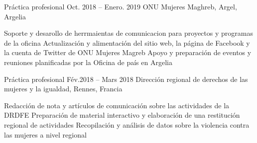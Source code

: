 \begin{joblist}

\item[Práctica profesional]{Oct. 2018 -- Enero. 2019 }     
	{ONU Mujeres Maghreb, Argel, Argelia}     
	{
			 
		\vspace{-0.5cm}
		\begin{itemize}
			  \iftbftiny \setlength\itemsep{-3pt} \fi
			  \cvitem[\checkmark] Soporte y desarollo de herrmaientas de comunicacion para proyectos y programas de la oficina      
 			  \cvitem[\checkmark] Actualización y alimentación del sitio web, la página de Facebook y la cuenta de Twitter de ONU Mujeres Magreb                                                          
			  \cvitem[\checkmark] Apoyo y preparación de eventos y reuniones planificadas por la Oficina de país en Argelia
		\end{itemize}      

	}


\item[Práctica profesional]{Fév.2018 -- Mars 2018 }     
	{Dirección regional de derechos de las mujeres y la igualdad, Rennes, Francia}     
	{
			 
		\iftbftiny \vspace{-0.5cm} \fi
		\begin{itemize}
			  \iftbftiny \setlength\itemsep{-3pt} \fi
			  \cvitem[\checkmark] Redacción de nota y artículos de comunicación sobre las actividades de la DRDFE  
			  \cvitem[\checkmark] Preparación de material interactivo y elaboración de una restitución regional de actividades
			  \cvitem[\checkmark] Recopilación y análisis de datos sobre la violencia contra las mujeres a nivel regional
		\end{itemize}      

}
\end{joblist}
